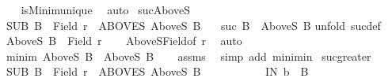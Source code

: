 \begin{isabellebody}
\ \ \isamarkupfalse%
\ isMinim{\isacharunderscore}{\kern0pt}unique\ \isamarkupfalse%
\ auto\isanewline
{}\isamarkupfalse%
%
\endisatagproof
{\isafoldproof}%
%
\isadelimproof
%
\endisadelimproof
%
\isadelimdocument
%
\endisadelimdocument
%
\isatagdocument
%
\isamarkuptrue%
%
\endisatagdocument
{\isafolddocument}%
%
\isadelimdocument
%
\endisadelimdocument
{}\isamarkupfalse%
\ suc{\isacharunderscore}{\kern0pt}AboveS{\isacharcolon}{\kern0pt}\isanewline
{}\ SUB{\isacharcolon}{\kern0pt}\ {\isachardoublequoteopen}B\ {\isasymle}\ Field\ r{\isachardoublequoteclose}\ \ ABOVES{\isacharcolon}{\kern0pt}\ {\isachardoublequoteopen}AboveS\ B\ {\isasymnoteq}\ {\isacharbraceleft}{\kern0pt}{\isacharbraceright}{\kern0pt}{\isachardoublequoteclose}\isanewline
{}\ {\isachardoublequoteopen}suc\ B\ {\isasymin}\ AboveS\ B{\isachardoublequoteclose}\isanewline
%
\isadelimproof
%
\endisadelimproof
%
\isatagproof
{}\isamarkupfalse%
{\isacharparenleft}{\kern0pt}unfold\ suc{\isacharunderscore}{\kern0pt}def{\isacharparenright}{\kern0pt}\isanewline
\ \ \isamarkupfalse%
\ {\isachardoublequoteopen}AboveS\ B\ {\isasymle}\ Field\ r{\isachardoublequoteclose}\isanewline
\ \ \isamarkupfalse%
\ AboveS{\isacharunderscore}{\kern0pt}Field{\isacharbrackleft}{\kern0pt}of\ r{\isacharbrackright}{\kern0pt}\ \isamarkupfalse%
\ auto\isanewline
\ \ \isamarkupfalse%
\ {\isachardoublequoteopen}minim\ {\isacharparenleft}{\kern0pt}AboveS\ B{\isacharparenright}{\kern0pt}\ {\isasymin}\ AboveS\ B{\isachardoublequoteclose}\isanewline
\ \ \isamarkupfalse%
\ assms\ \isamarkupfalse%
\ {\isacharparenleft}{\kern0pt}simp\ add{\isacharcolon}{\kern0pt}\ minim{\isacharunderscore}{\kern0pt}in{\isacharparenright}{\kern0pt}\isanewline
{}\isamarkupfalse%
%
\endisatagproof
{\isafoldproof}%
%
\isadelimproof
\isanewline
%
\endisadelimproof
\isanewline
{}\isamarkupfalse%
\ suc{\isacharunderscore}{\kern0pt}greater{\isacharcolon}{\kern0pt}\isanewline
{}\ SUB{\isacharcolon}{\kern0pt}\ {\isachardoublequoteopen}B\ {\isasymle}\ Field\ r{\isachardoublequoteclose}\ \ ABOVES{\isacharcolon}{\kern0pt}\ {\isachardoublequoteopen}AboveS\ B\ {\isasymnoteq}\ {\isacharbraceleft}{\kern0pt}{\isacharbraceright}{\kern0pt}{\isachardoublequoteclose}\ \isanewline
\ \ \ \ \ \ \ \ IN{\isacharcolon}{\kern0pt}\ {\isachardoublequoteopen}b\ {\isasymin}\ B{\isachardoublequoteclose}\isanewline

\end{isabellebody}
